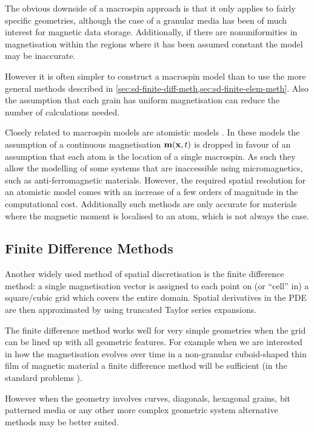 The obvious downside of a macrospin approach is that it only applies to fairly specific geometries, although the case of a granular media has been of much interest for magnetic data storage.
Additionally, if there are nonuniformities in magnetisation within the regions where it has been assumed constant the model may be inaccurate.

However it is often simpler to construct a macrospin model than to use the more general methods described in \cref{sec:sd-finite-diff-meth,sec:sd-finite-elem-meth}.
Also the assumption that each grain has uniform magnetisation can reduce the number of calculations needed.

Closely related to macrospin models are atomistic models \cite{Evans2014}.
In these models the assumption of a continuous magnetisation $\boldsymbol{\mathrm{m}}(\boldsymbol{\mathrm{x}}, t)$ is dropped in favour of an assumption that each atom is the location of a single macrospin.
As such they allow the modelling of some systems that are inaccessible using micromagnetics, such as anti-ferromagnetic materials.
However, the required spatial resolution for an atomistic model comes with an increase of a few orders of magnitude in the computational cost.
Additionally such methods are only accurate for materials where the magnetic moment is localised to an atom, which is not always the case.


\subsection{Finite Difference Methods}
\label{sec:sd-finite-diff-meth}

Another widely used method of spatial discretisation is the finite difference method: a single magnetisation vector is assigned to each point on (or ``cell'' in) a square/cubic grid which covers the entire domain.
Spatial derivatives in the PDE are then approximated by using truncated Taylor series expansions.

The finite difference method works well for very simple geometries when the grid can be lined up with all geometric features.
For example when we are interested in how the magnetisation evolves over time in a non-granular cuboid-shaped thin film of magnetic material a finite difference method will be sufficient (\eg in the \mumag standard problems \cite{mumag-website}).

However when the geometry involves curves, diagonals, hexagonal grains, bit patterned media or any other more complex geometric system alternative methods may be better suited.


